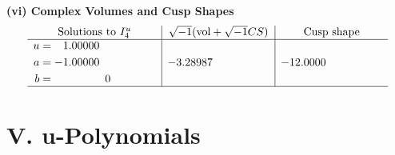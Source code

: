 \documentclass[1p]{elsarticle_modified}
\theoremstyle{definition}
\newcommand{\I}{\sqrt{-1}}
\begin{document}
\newpage\flushleft \textbf{(vi) Complex Volumes and Cusp Shapes}
$$\begin{array}{c|c|c}  
\text{Solutions to }I^u_{4}& \I (\text{vol} + \sqrt{-1}CS) & \text{Cusp shape}\\
 \hline 
\begin{aligned}
u &= \phantom{-}1.00000\phantom{ +0.000000I} \\
a &= -1.00000\phantom{ +0.000000I} \\
b &= \phantom{-0.000000 } 0\end{aligned}
 & -3.28987\phantom{ +0.000000I} & -12.0000\phantom{ +0.000000I}\\
 \hline 
 \end{array}$$\newpage
\newpage\renewcommand{\arraystretch}{1}
\centering \section*{ V. u-Polynomials}
\end{document}
